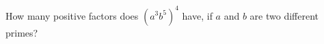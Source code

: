 How many positive factors does $\left(a^3b^5\right)^4$ have, if $a$ and $b$ are two different primes?
